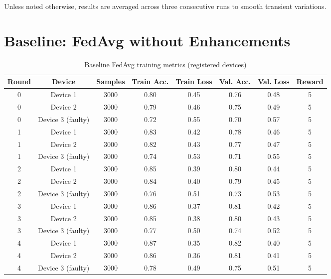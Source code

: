 Unless noted otherwise, results are averaged across three consecutive runs to smooth transient variations.

\section{Baseline: FedAvg without Enhancements}

\begin{table}[h!]
    \centering
    \caption{Baseline FedAvg training metrics (registered devices)}
    \label{tab:baseline_fedavg}
    \begin{tabular}{c c c c c c c c}
        \toprule
        \textbf{Round} & \textbf{Device} & \textbf{Samples} & \textbf{Train Acc.} & \textbf{Train Loss} & \textbf{Val. Acc.} & \textbf{Val. Loss} & \textbf{Reward} \\
        \midrule
        0 & Device 1 & 3000 & 0.80 & 0.45 & 0.76 & 0.48 & 5 \\
        0 & Device 2 & 3000 & 0.79 & 0.46 & 0.75 & 0.49 & 5 \\
        0 & Device 3 (faulty) & 3000 & 0.72 & 0.55 & 0.70 & 0.57 & 5 \\
        1 & Device 1 & 3000 & 0.83 & 0.42 & 0.78 & 0.46 & 5 \\
        1 & Device 2 & 3000 & 0.82 & 0.43 & 0.77 & 0.47 & 5 \\
        1 & Device 3 (faulty) & 3000 & 0.74 & 0.53 & 0.71 & 0.55 & 5 \\
        2 & Device 1 & 3000 & 0.85 & 0.39 & 0.80 & 0.44 & 5 \\
        2 & Device 2 & 3000 & 0.84 & 0.40 & 0.79 & 0.45 & 5 \\
        2 & Device 3 (faulty) & 3000 & 0.76 & 0.51 & 0.73 & 0.53 & 5 \\
        3 & Device 1 & 3000 & 0.86 & 0.37 & 0.81 & 0.42 & 5 \\
        3 & Device 2 & 3000 & 0.85 & 0.38 & 0.80 & 0.43 & 5 \\
        3 & Device 3 (faulty) & 3000 & 0.77 & 0.50 & 0.74 & 0.52 & 5 \\
        4 & Device 1 & 3000 & 0.87 & 0.35 & 0.82 & 0.40 & 5 \\
        4 & Device 2 & 3000 & 0.86 & 0.36 & 0.81 & 0.41 & 5 \\
        4 & Device 3 (faulty) & 3000 & 0.78 & 0.49 & 0.75 & 0.51 & 5 \\
        \bottomrule
    \end{tabular}
\end{table}

